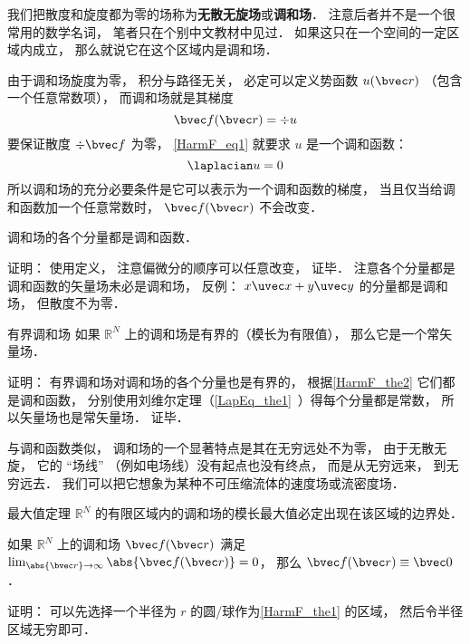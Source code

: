 
\begin{issues}
\issueDraft
\end{issues}


我们把散度和旋度都为零的场称为\textbf{无散无旋场}或\textbf{调和场}． 注意后者并不是一个很常用的数学名词， 笔者只在个别中文教材中见过． 如果这只在一个空间的一定区域内成立， 那么就说它在这个区域内是调和场．

由于调和场旋度为零， 积分与路径无关， 必定可以定义势函数 $u(\bvec r)$ （包含一个任意常数项）， 而调和场就是其梯度
\begin{equation}\label{HarmF_eq1}
\bvec f(\bvec r) = \div u
\end{equation}
要保证散度 $\div \bvec f$ 为零， \autoref{HarmF_eq1} 就要求 $u$ 是一个调和函数：
\begin{equation}
\laplacian u = 0
\end{equation}
所以调和场的充分必要条件是它可以表示为一个调和函数的梯度， 当且仅当给调和函数加一个任意常数时， $\bvec f(\bvec r)$ 不会改变．

\begin{theorem}{}\label{HarmF_the2}
调和场的各个分量都是调和函数．
\end{theorem}
证明： 使用定义， 注意偏微分的顺序可以任意改变， 证毕． 注意各个分量都是调和函数的矢量场未必是调和场， 反例： $x\uvec x + y \uvec y$ 的分量都是调和场， 但散度不为零．

\begin{corollary}{有界调和场}
如果 $\mathbb R^N$ 上的调和场是有界的（模长为有限值）， 那么它是一个常矢量场．
\end{corollary}
证明： 有界调和场对调和场的各个分量也是有界的， 根据\autoref{HarmF_the2} 它们都是调和函数， 分别使用刘维尔定理（\autoref{LapEq_the1}~）得每个分量都是常数， 所以矢量场也是常矢量场． 证毕．

与调和函数类似， 调和场的一个显著特点是其在无穷远处不为零， 由于无散无旋， 它的 “场线” （例如电场线）没有起点也没有终点， 而是从无穷远来， 到无穷远去． 我们可以把它想象为某种不可压缩流体的速度场或流密度场．

\begin{theorem}{最大值定理}\label{HarmF_the1}
$\mathbb R^N$ 的有限区域内的调和场的模长最大值必定出现在该区域的边界处．
\end{theorem}

\begin{corollary}{}
如果 $\mathbb R^N$ 上的调和场 $\bvec f(\bvec r)$ 满足 $\lim_{\abs{\bvec r}\to \infty} \abs{\bvec f(\bvec r)}  = 0$， 那么 $\bvec f(\bvec r) \equiv \bvec 0$．
\end{corollary}
证明： 可以先选择一个半径为 $r$ 的圆/球作为\autoref{HarmF_the1} 的区域， 然后令半径区域无穷即可．
